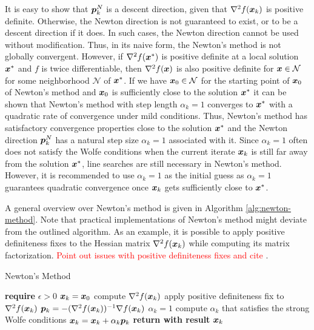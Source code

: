 It is easy to show that $\bm{p}^N_k$ is a descent direction, given that $\nabla^2 f(\bm{x}_k)$ is positive definite. 
Otherwise, the Newton direction is not guaranteed to exist, or to be a descent direction if it does. In such cases, the Newton direction cannot 
be used without modification. Thus, in its naive form, the Newton's method is not globally convergent. However, if $\nabla^2 f(\bm{x}^*)$ is positive
definite at a local solution $\bm{x}^*$ and $f$ is twice differentiable, then $\nabla^2 f(\bm{x})$ is also positive definite for $\bm{x} \in 
\mathcal{N}$ for some neighborhood $\mathcal{N}$ of $\bm{x}^*$. If we have $\bm{x}_0 \in \mathcal{N}$ for the starting point of $\bm{x}_0$
of Newton's method and $\bm{x}_0$ is sufficiently close to the solution $\bm{x}^*$ it can be shown that Newton's method with step length
$\alpha_k = 1$ converges to $\bm{x}^*$ with a quadratic rate of convergence under mild conditions. Thus, Newton's method 
has satisfactory convergence properties close to the solution $\bm{x}^*$ and the Newton direction $\bm{p}^N_k$ has a natural step size 
$\alpha_k = 1$ associated with it. Since $\alpha_k = 1$ often does not satisfy the Wolfe conditions when the current iterate $\bm{x}_k$ is still 
far away from the solution $\bm{x}^*$, line searches are still necessary in Newton's method. However, it is recommended to use $\alpha_k = 1$ as the
initial guess as $\alpha_k = 1$ guarantees quadratic convergence once $\bm{x}_k$ gets sufficiently close to $\bm{x}^*$.

A general overview over Newton's method is given in Algorithm \ref{alg:newton-method}. Note that practical implementations of Newton's method might deviate
from the outlined algorithm. As an example, it is possible to apply positive definiteness fixes to the Hessian matrix $\nabla^2 f(\bm{x}_k)$
while computing its matrix factorization. \textcolor{red}{Point out issues with positive definiteness fixes and cite \cite{longva2023}}.

\begin{algorithm}
\caption{Newton's Method}\label{alg:newton-method}
\begin{algorithmic}
\State \textbf{require } $\epsilon > 0$
\State $\bm{x}_k = \bm{x}_0$
\State compute $\nabla^2 f(\bm{x}_k)$
\State apply positive definiteness fix to $\nabla^2 f(\bm{x}_k)$
\EndIf
\State $\bm{p}_k = -(\nabla^2 f(\bm{x}_k))^{-1} \nabla f(\bm{x}_k)$
\State $\alpha_k = 1$
\State compute $\alpha_k$ that satisfies the strong Wolfe conditions
\EndIf
\State $\bm{x}_k = \bm{x}_k + \alpha_k \bm{p}_k$
\EndWhile
\State \textbf{return with result } $\bm{x}_k$
\EndProcedure
\end{algorithmic}
\end{algorithm}

